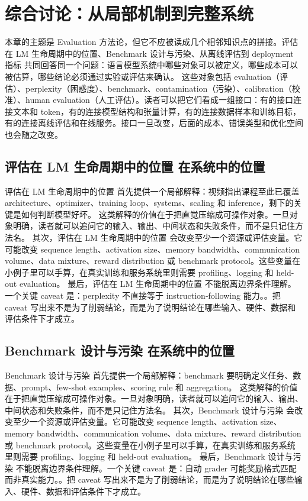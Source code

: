 \documentclass[a4paper]{article}
\begin{document}
\section{综合讨论：从局部机制到完整系统}
本章的主题是 Evaluation 方法论，但它不应被读成几个相邻知识点的拼接。评估在 LM 生命周期中的位置、Benchmark 设计与污染、从离线评估到 deployment 指标 共同回答同一个问题：语言模型系统中哪些对象可以被定义，哪些成本可以被估算，哪些结论必须通过实验或评估来确认。
这些对象包括 evaluation（评估）、perplexity（困惑度）、benchmark、contamination（污染）、calibration（校准）、human evaluation（人工评估）。读者可以把它们看成一组接口：有的接口连接文本和 token，有的连接模型结构和张量计算，有的连接数据样本和训练目标，有的连接离线评估和在线服务。接口一旦改变，后面的成本、错误类型和优化空间也会随之改变。
\subsection{评估在 LM 生命周期中的位置 在系统中的位置}
评估在 LM 生命周期中的位置 首先提供一个局部解释：视频指出课程至此已覆盖 architecture、optimizer、training loop、systems、scaling 和 inference，剩下的关键是如何判断模型好坏。 这类解释的价值在于把直觉压缩成可操作对象。一旦对象明确，读者就可以追问它的输入、输出、中间状态和失败条件，而不是只记住方法名。
其次，评估在 LM 生命周期中的位置 会改变至少一个资源或评估变量。它可能改变 sequence length、activation size、memory bandwidth、communication volume、data mixture、reward distribution 或 benchmark protocol。这些变量在小例子里可以手算，在真实训练和服务系统里则需要 profiling、logging 和 held-out evaluation。
最后，评估在 LM 生命周期中的位置 不能脱离边界条件理解。一个关键 caveat 是：perplexity 不直接等于 instruction-following 能力。。把 caveat 写出来不是为了削弱结论，而是为了说明结论在哪些输入、硬件、数据和评估条件下才成立。
\subsection{Benchmark 设计与污染 在系统中的位置}
Benchmark 设计与污染 首先提供一个局部解释：benchmark 要明确定义任务、数据、prompt、few-shot examples、scoring rule 和 aggregation。 这类解释的价值在于把直觉压缩成可操作对象。一旦对象明确，读者就可以追问它的输入、输出、中间状态和失败条件，而不是只记住方法名。
其次，Benchmark 设计与污染 会改变至少一个资源或评估变量。它可能改变 sequence length、activation size、memory bandwidth、communication volume、data mixture、reward distribution 或 benchmark protocol。这些变量在小例子里可以手算，在真实训练和服务系统里则需要 profiling、logging 和 held-out evaluation。
最后，Benchmark 设计与污染 不能脱离边界条件理解。一个关键 caveat 是：自动 grader 可能奖励格式匹配而非真实能力。。把 caveat 写出来不是为了削弱结论，而是为了说明结论在哪些输入、硬件、数据和评估条件下才成立。
\end{document}
